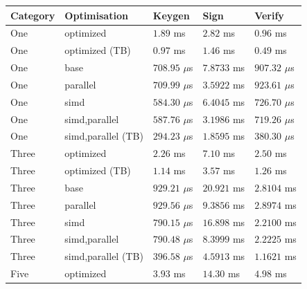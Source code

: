 \documentclass[11pt]{report}
\theoremstyle{definition}
\theoremstyle{plain}
\begin{document}
\begin{table}[H]
  \centering
  \begin{tabular}{l|l|lll}
    \hline
    Category                       & Optimisation       & Keygen          & Sign        & Verify          \\
    \hline
    \hline
    One \cite{aguilar2023return}   & optimized          & $1.89$ ms       & $2.82$ ms   & $0.96$ ms       \\
    One \cite{aguilar2023return}   & optimized (TB)     & $0.97$ ms       & $1.46$ ms   & $0.49$ ms       \\
    \arrayrulecolor{lightgray}\hline\arrayrulecolor{black}
    One                            & base               & $708.95$ $\mu$s & $7.8733$ ms & $907.32$ $\mu$s \\
    One                            & parallel           & $709.99$ $\mu$s & $3.5922$ ms & $923.61$ $\mu$s \\
    One                            & simd               & $584.30$ $\mu$s & $6.4045$ ms & $726.70$ $\mu$s \\
    One                            & simd,parallel      & $587.76$ $\mu$s & $3.1986$ ms & $719.26$ $\mu$s \\
    One                            & simd,parallel (TB) & $294.23$ $\mu$s & $1.8595$ ms & $380.30$ $\mu$s \\
    \hline
    Three \cite{aguilar2023return} & optimized          & $2.26$ ms       & $7.10$ ms   & $2.50$ ms       \\
    Three \cite{aguilar2023return} & optimized (TB)     & $1.14$ ms       & $3.57$ ms   & $1.26$ ms       \\
    \arrayrulecolor{lightgray}\hline\arrayrulecolor{black}
    Three                          & base               & $929.21$ $\mu$s & $20.921$ ms & $2.8104$ ms     \\
    Three                          & parallel           & $929.56$ $\mu$s & $9.3856$ ms & $2.8974$ ms     \\
    Three                          & simd               & $790.15$ $\mu$s & $16.898$ ms & $2.2100$ ms     \\
    Three                          & simd,parallel      & $790.48$ $\mu$s & $8.3999$ ms & $2.2225$ ms     \\
    Three                          & simd,parallel (TB) & $396.58$ $\mu$s & $4.5913$ ms & $1.1621$ ms     \\
    \hline
    Five \cite{aguilar2023return}  & optimized          & $3.93$ ms       & $14.30$ ms  & $4.98$ ms       \\

\end{tabular}
\end{table}
\end{document}
